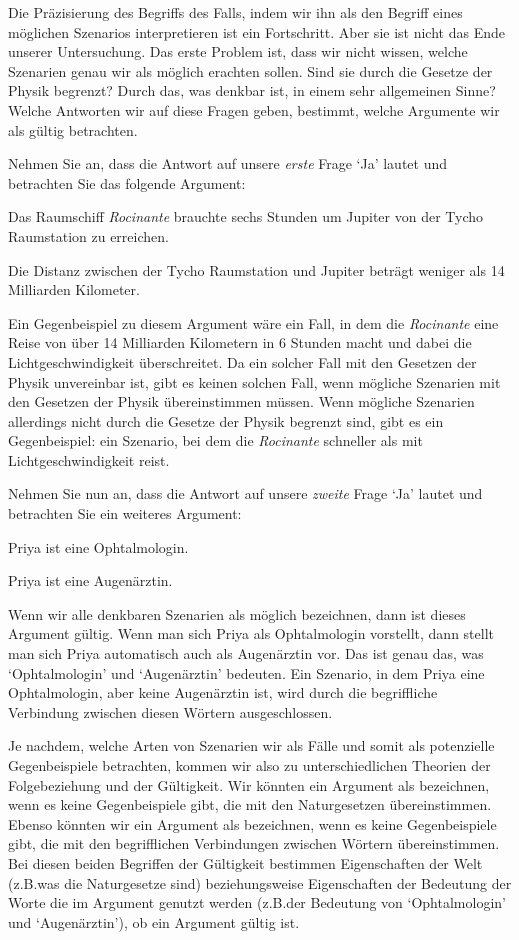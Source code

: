 Die Präzisierung des Begriffs des Falls, indem wir ihn als den Begriff eines möglichen Szenarios interpretieren ist ein Fortschritt. Aber sie ist nicht das Ende unserer Untersuchung. Das erste Problem ist, dass wir nicht wissen, welche Szenarien genau wir als möglich erachten sollen. Sind sie durch die Gesetze der Physik begrenzt? Durch das, was denkbar ist, in einem sehr allgemeinen Sinne? Welche Antworten wir auf diese Fragen geben, bestimmt, welche Argumente wir als gültig betrachten.

Nehmen Sie an, dass die Antwort auf unsere \emph{erste} Frage `Ja' lautet und betrachten Sie das folgende Argument:
	\begin{earg}
		\item[] Das Raumschiff \emph{Rocinante} brauchte sechs Stunden um Jupiter von der Tycho Raumstation zu erreichen.
		\item[\therefore] Die Distanz zwischen der Tycho Raumstation und Jupiter beträgt weniger als 14 Milliarden Kilometer.
	\end{earg}
Ein Gegenbeispiel zu diesem Argument wäre ein Fall, in dem die \emph{Rocinante} eine Reise von über 14 Milliarden Kilometern in 6 Stunden macht und dabei die Lichtgeschwindigkeit überschreitet. Da ein solcher Fall mit den Gesetzen der Physik unvereinbar ist, gibt es keinen solchen Fall, wenn mögliche Szenarien mit den Gesetzen der Physik übereinstimmen müssen. Wenn mögliche Szenarien allerdings nicht durch die Gesetze der Physik begrenzt sind, gibt es ein Gegenbeispiel: ein Szenario, bei dem die \emph{Rocinante} schneller als mit Lichtgeschwindigkeit reist. 

Nehmen Sie nun an, dass die Antwort auf unsere \emph{zweite} Frage `Ja' lautet und betrachten Sie ein weiteres Argument:
	\begin{earg}
		\item[] Priya ist eine Ophtalmologin.
		\item[\therefore] Priya ist eine Augenärztin.
	\end{earg}
Wenn wir alle denkbaren Szenarien als möglich bezeichnen, dann ist dieses Argument gültig. Wenn man sich Priya als Ophtalmologin vorstellt, dann stellt man sich Priya automatisch auch als Augenärztin vor. Das ist genau das, was `Ophtalmologin' und `Augenärztin' bedeuten. Ein Szenario, in dem Priya eine Ophtalmologin, aber keine Augenärztin ist, wird durch die begriffliche Verbindung zwischen diesen Wörtern ausgeschlossen.

Je nachdem, welche Arten von Szenarien wir als Fälle und somit als potenzielle Gegenbeispiele betrachten, kommen wir also zu unterschiedlichen Theorien der Folgebeziehung und der Gültigkeit. Wir könnten ein Argument als  bezeichnen, wenn es keine Gegenbeispiele gibt, die mit den Naturgesetzen übereinstimmen. Ebenso könnten wir ein Argument als  bezeichnen, wenn es keine Gegenbeispiele gibt, die mit den begrifflichen Verbindungen zwischen Wörtern übereinstimmen. Bei diesen beiden Begriffen der Gültigkeit bestimmen Eigenschaften der Welt (z.B.\@ was die Naturgesetze sind) beziehungsweise Eigenschaften der Bedeutung der Worte die im Argument genutzt werden (z.B.\@ der Bedeutung von `Ophtalmologin' und `Augenärztin'), ob ein Argument gültig ist.

